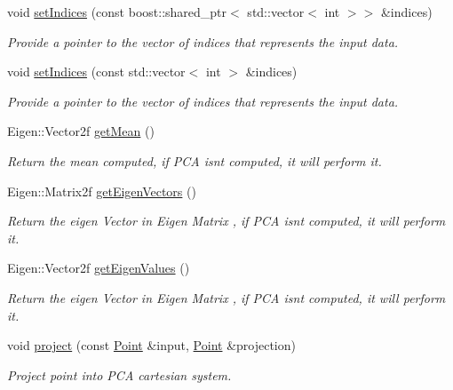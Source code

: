 \begin{DoxyCompactItemize}
void \hyperlink{classPCA2D_a4e7f046e1198928994dfc40a4c3be40e}{set\+Indices} (const boost\+::shared\+\_\+ptr$<$ std\+::vector$<$ int $>$$>$ \&indices)
\begin{DoxyCompactList}\small\item\em Provide a pointer to the vector of indices that represents the input data. \end{DoxyCompactList}\item 
void \hyperlink{classPCA2D_aa5b9ccb12b5ce673ac851a2a5c4f4f97}{set\+Indices} (const std\+::vector$<$ int $>$ \&indices)
\begin{DoxyCompactList}\small\item\em Provide a pointer to the vector of indices that represents the input data. \end{DoxyCompactList}\item 
Eigen\+::\+Vector2f \hyperlink{classPCA2D_a35ed9e55a614bb7fd87025945867cffa}{get\+Mean} ()
\begin{DoxyCompactList}\small\item\em Return the mean computed, if P\+CA isn\textquotesingle{}t computed, it will perform it. \end{DoxyCompactList}\item 
Eigen\+::\+Matrix2f \hyperlink{classPCA2D_a2243f1d03a734f7cf4f9f959f494a2e0}{get\+Eigen\+Vectors} ()
\begin{DoxyCompactList}\small\item\em Return the eigen Vector in Eigen Matrix , if P\+CA isn\textquotesingle{}t computed, it will perform it. \end{DoxyCompactList}\item 
Eigen\+::\+Vector2f \hyperlink{classPCA2D_ace26902adea167c5aef9a3219ceafbd3}{get\+Eigen\+Values} ()
\begin{DoxyCompactList}\small\item\em Return the eigen Vector in Eigen Matrix , if P\+CA isn\textquotesingle{}t computed, it will perform it. \end{DoxyCompactList}\item 
void \hyperlink{classPCA2D_a9768dbce5a3b9cd0b3aacbedc3301884}{project} (const \hyperlink{Normal2dEstimation_8h_ab8d898f36957cca40634530a6f118a3e}{Point} \&input, \hyperlink{Normal2dEstimation_8h_ab8d898f36957cca40634530a6f118a3e}{Point} \&projection)
\begin{DoxyCompactList}\small\item\em Project point into P\+CA cartesian system. \end{DoxyCompactList}\item 
$$
\end{DoxyCompactItemize}
